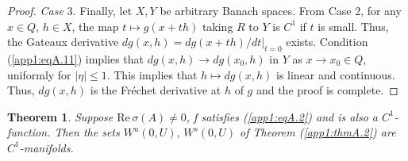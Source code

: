 \documentclass{surv-l}
\theoremstyle{plain}
\newtheorem{theorem}{Theorem}[section]
\theoremstyle{definition}
\numberwithin{equation}{section}
\numberwithin{figure}{chapter}
\begin{document}
\begin{proof}
\emph{Case} 3. Finally, let $X,Y$ be arbitrary Banach spaces. From Case 2, for any $x\in Q$, $h\in X$, the map $t\mapsto g(x+th)$ taking $R$ to $Y$ is $C^{1}$ if $t$ is small. Thus, the Gateaux derivative $dg(x, h)=dg(x+th)/dt|_{t=0}$ exists. Condition (\ref{app1:eqA.11}) implies that $dg(x, h)\rightarrow dg(x_{0}, h)$ in $Y$ as $x\rightarrow x_{0}\in Q$, uniformly for $|\eta|\leq 1$. This implies that $h\mapsto dg(x, h)$ is linear and continuous. Thus, $dg(x, h)$ is the Fr\'{e}chet derivative at $h$ of $g$ and the proof is complete.
\end{proof}
\begin{theorem}\label{app1:thmA.4}
Suppose ${\mathrm{Re}}\,\sigma(A)\neq 0$, f satisfies \emph{(\ref{app1:eqA.2})} and is also a $C^{1}$-function. Then the sets $W^{u}(0, U),\,W^{s}(0, U)$ of Theorem \emph{(\ref{app1:thmA.2})} are $C^{1}$-manifolds.
\end{theorem}
\end{document}
